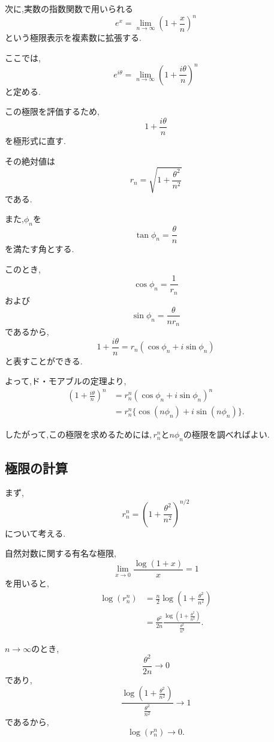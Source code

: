  次に,実数の指数関数で用いられる
  \[
    e^x
    =
    \lim_{n\to\infty}
    \left(
      1+\frac{x}{n}
    \right)^n
  \]
  という極限表示を複素数に拡張する.

  ここでは,
  \[
    e^{i\theta}
    =
    \lim_{n\to\infty}
    \left(
      1+\frac{i\theta}{n}
    \right)^n
  \]
  と定める.

  この極限を評価するため,
  \[
    1+\frac{i\theta}{n}
  \]
  を極形式に直す.

  その絶対値は
  \[
    r_n
    =
    \sqrt{
      1+\frac{\theta^2}{n^2}
    }
  \]
  である.

  また,$\phi_n$を
  \[
    \tan\phi_n
    =
    \frac{\theta}{n}
  \]
  を満たす角とする.

  このとき,
  \[
    \cos\phi_n
    =
    \frac{1}{r_n}
  \]
  および
  \[
    \sin\phi_n
    =
    \frac{\theta}{nr_n}
  \]
  であるから,
  \[
    1+\frac{i\theta}{n}
    =
    r_n(
      \cos\phi_n+i\sin\phi_n
    )
  \]
  と表すことができる.

  よって,ド・モアブルの定理より,
  \begin{align*}
    \left(
      1+\frac{i\theta}{n}
    \right)^n
    &=
    r_n^n
    (\cos\phi_n+i\sin\phi_n)^n\\
    &=
    r_n^n
    \{
      \cos(n\phi_n)
      +i\sin(n\phi_n)
    \}.
  \end{align*}

  したがって,この極限を求めるためには,\,$r_n^n$と$n\phi_n$の極限を調べればよい.

\subsection{極限の計算}

  まず,
  \[
    r_n^n
    =
    \left(
      1+\frac{\theta^2}{n^2}
    \right)^{n/2}
  \]
  について考える.

  自然対数に関する有名な極限,
  \[
    \lim_{x\to0}
    \frac{\log(1+x)}{x}
    =
    1
  \]
  を用いると,
  \begin{align*}
    \log(r_n^n)
    &=
    \frac n2
    \log
    \left(
      1+\frac{\theta^2}{n^2}
    \right)\\
    &=
    \frac{\theta^2}{2n}
    \frac{
      \log
      \left(
        1+\frac{\theta^2}{n^2}
      \right)
    }{
      \frac{\theta^2}{n^2}
    }.
  \end{align*}

  $n\to\infty$のとき,
  \[
    \frac{\theta^2}{2n}\to0
  \]
  であり,
  \[
    \frac{
      \log
      \left(
        1+\frac{\theta^2}{n^2}
      \right)
    }{
      \frac{\theta^2}{n^2}
    }
    \to1
  \]
  であるから,
  \[
    \log(r_n^n)\to0.
  \]

